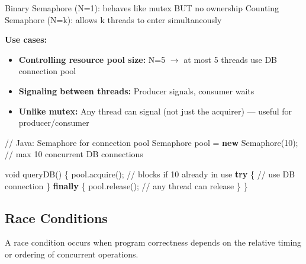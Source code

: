 \documentclass[11pt]{article}
\providecommand{\tightlist}{\setlength{\itemsep}{1pt}\setlength{\parskip}{0pt}}
\newenvironment{Shaded}{\begin{snugshade}}{\end{snugshade}}
\newcommand{\BuiltInTok}[1]{\textcolor[rgb]{0.50,0.55,0.55}{#1}}
\newcommand{\CommentTok}[1]{\textcolor[rgb]{0.48,0.49,0.49}{#1}}
\newcommand{\ControlFlowTok}[1]{\textcolor[rgb]{0.99,0.74,0.29}{\textbf{#1}}}
\newcommand{\DataTypeTok}[1]{\textcolor[rgb]{0.16,0.50,0.73}{#1}}
\newcommand{\DecValTok}[1]{\textcolor[rgb]{0.96,0.45,0.00}{#1}}
\newcommand{\FunctionTok}[1]{\textcolor[rgb]{0.56,0.27,0.68}{#1}}
\newcommand{\KeywordTok}[1]{\textcolor[rgb]{0.81,0.81,0.76}{\textbf{#1}}}
\newcommand{\NormalTok}[1]{\textcolor[rgb]{0.81,0.81,0.76}{#1}}
\newcommand{\OperatorTok}[1]{\textcolor[rgb]{0.81,0.81,0.76}{#1}}
\begin{document}
\begin{Shaded}
\begin{Highlighting}[]
\NormalTok{Binary Semaphore (N}\OperatorTok{=}\DecValTok{1}\NormalTok{):  behaves like mutex BUT no ownership}
\NormalTok{Counting Semaphore (N}\OperatorTok{=}\NormalTok{k): allows k threads to enter simultaneously}
\end{Highlighting}
\end{Shaded}

\textbf{Use cases:}

\begin{itemize}
\tightlist
\item
  \textbf{Controlling resource pool size:} N=5 \(\rightarrow\) at most 5 threads use DB connection pool
\item
  \textbf{Signaling between threads:} Producer signals, consumer waits
\item
  \textbf{Unlike mutex:} Any thread can signal (not just the acquirer) --- useful for producer/consumer
\end{itemize}


\begin{Shaded}
\begin{Highlighting}[]
\CommentTok{// Java: Semaphore for connection pool}
\BuiltInTok{Semaphore}\NormalTok{ pool }\OperatorTok{=} \KeywordTok{new} \BuiltInTok{Semaphore}\OperatorTok{(}\DecValTok{10}\OperatorTok{);} \CommentTok{// max 10 concurrent DB connections}

\DataTypeTok{void} \FunctionTok{queryDB}\OperatorTok{()} \OperatorTok{\{}
\NormalTok{    pool}\OperatorTok{.}\FunctionTok{acquire}\OperatorTok{();}     \CommentTok{// blocks if 10 already in use}
    \ControlFlowTok{try} \OperatorTok{\{}
        \CommentTok{// use DB connection}
    \OperatorTok{\}} \ControlFlowTok{finally} \OperatorTok{\{}
\NormalTok{        pool}\OperatorTok{.}\FunctionTok{release}\OperatorTok{();} \CommentTok{// any thread can release}
    \OperatorTok{\}}
\OperatorTok{\}}
\end{Highlighting}
\end{Shaded}

\subsection{Race Conditions}\label{race-conditions}

A race condition occurs when program correctness depends on the relative timing or ordering of concurrent operations.
\end{document}

